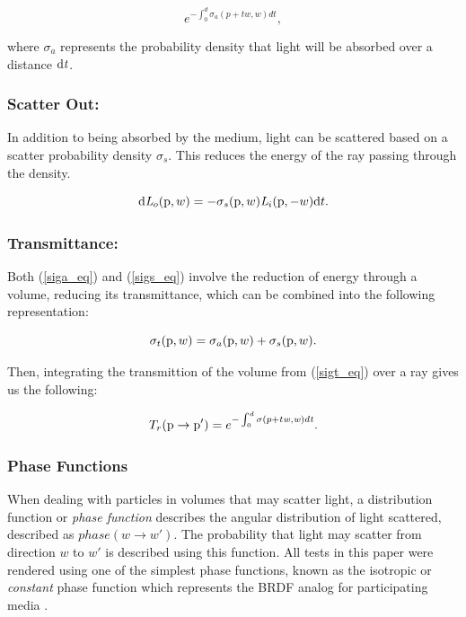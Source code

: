 \documentclass[runningheads]{llncs}
\begin{document}
\begin{equation}
e^{-\int_{0}^{d}\sigma_{a} (p+t\mathit{w},\mathit{w})d\mathit{t}},
\label{siga_eq}
\end{equation}

where $\sigma_{a}$ represents the probability density that light will be absorbed over a distance $\textup{d}\mathit{t}$.

\subsubsection{Scatter Out:}
In addition to being absorbed by the medium, light can be scattered based on a scatter probability density $\sigma_{s}$.  This reduces the energy of the ray passing through the density.

\begin{equation}
\textup{d}\mathit{L}_{o}(\textup{p},w) = -\sigma_{s}(\textup{p},w) \mathit{L}_{i}(\textup{p},-w)\textup{d}t.
\label{sigs_eq}
\end{equation}

\subsubsection{Transmittance:}
Both (\ref{siga_eq}) and (\ref{sigs_eq}) involve the reduction of energy through a volume, reducing its transmittance, which can be combined into the following representation:

\begin{equation}
\sigma_{t}(\textup{p},w) = \sigma_{a}(\textup{p},w) + \sigma_{s}(\textup{p}, w).
\label{sigt_eq}
\end{equation}

Then, integrating the transmittion of the volume from (\ref{sigt_eq}) over a ray gives us the following:

\begin{equation}
T_{r}(\textup{p} \to \textup{p}') = e^{-\int_{0}^{d}\sigma (p+t\mathit{w},\mathit{w})d\mathit{t}}.
\label{transmittion_eq}
\end{equation}

\subsubsection{Phase Functions}
When dealing with particles in volumes that may scatter light, a distribution function or \textit{phase function} describes the angular distribution of light scattered, described as $phase(w \to w')$.  The probability that light may scatter from direction $w$ to $w'$ is described using this function.  All tests in this paper were rendered using one of the simplest phase functions, known as the isotropic or \textit{constant} phase function which represents the BRDF analog for participating media \cite{cerezo}.
\end{document}
